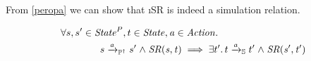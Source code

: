 From \cref{peropa} we can show that \i{SR} is indeed a simulation relation. 
\begin{theorem}\label{simsr}
    \begin{align*}
    &\forall s, s' \in \mathit{State}^P, t \in \mathit{State}, \mathit{a} \in \mathit{Action} \ldotp\\
    &\qquad \qquad s \xrightarrow{\mathit{a}}_{\mathbb P^\dagger} s'  \mathrel\land \mathit{SR(s, t)} \implies \exists t' \ldotp t \xrightarrow{\mathit{a}}_{\mathbb S} t' \mathrel\land \mathit{SR(s', t')} \\
    \end{align*}
\end{theorem}



